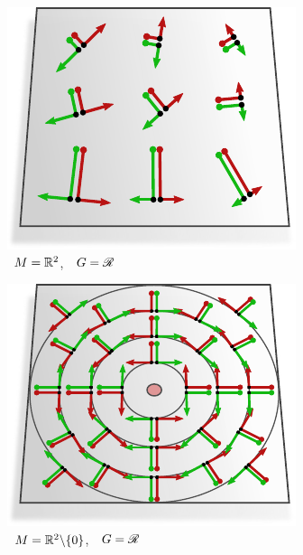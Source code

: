 \hfill
\begin{subfigure}[b]{0.26\textwidth}
    \centering
    \includegraphics[width=1.\textwidth]{figures/G_structure_R2_6_big.pdf}
    \captionsetup{format=hang}
    \caption{\small
        \,  $M = \mathbb{R}^2$,
        \,\ $G = \mathscr{R}$
    }
    \label{fig:G_structure_intro_e}
\end{subfigure}
\hfill
\begin{subfigure}[b]{0.26\textwidth}
    \centering
    \includegraphics[width=1.\textwidth]{figures/G_structure_R2_no_origin_O2_intro.pdf}
    \captionsetup{format=hang}
    \caption{\small
        \,  $M = \mathbb{R}^2\backslash\{0\}$,
        \,\ $G = \mathscr{R}$
    }
    \label{fig:G_structure_intro_f}
\end{subfigure}
